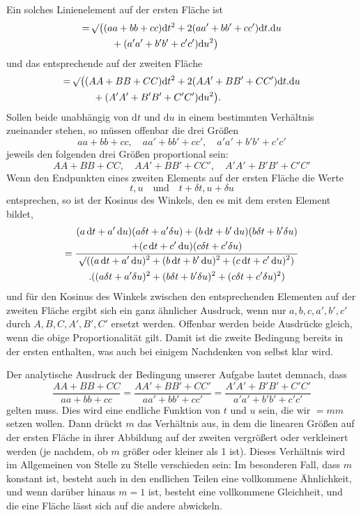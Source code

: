 Ein solches Linienelement auf der ersten Fläche ist
\[
\begin{aligned}
={}&\mathord{{}^{}\!\surd}\bigl((aa+bb+cc)\mathrm{d}t^2+2(aa'+bb'+cc')\mathrm{d}t\mathord{.}\mathrm{d}u\\
&\qquad+(a'a'+b'b'+c'c')\mathrm{d}u^2\bigr)
\end{aligned}
\]
\noindent und das entsprechende auf der zweiten Fläche
\[
\begin{aligned}
={}&\mathord{{}^{}\!\surd}\bigl((AA+BB+CC)\mathrm{d}t^2+2(AA'+BB'+CC')\mathrm{d}t\mathord{.}\mathrm{d}u\\
&\qquad+(A'A'+B'B'+C'C')\mathrm{d}u^2\bigr).
\end{aligned}
\]
\noindent Sollen beide unabhängig von \(\mathrm{d}t\) und \(\mathrm{d}u\) in einem bestimmten Verhältnis zueinander stehen, so müssen offenbar die drei Größen
\[
aa+bb+cc,\quad aa'+bb'+cc',\quad a'a'+b'b'+c'c'
\]
\noindent jeweils den folgenden drei Größen proportional sein:
\[
AA+BB+CC,\quad AA'+BB'+CC',\quad A'A'+B'B'+C'C'
\]
\noindent Wenn den Endpunkten eines zweiten Elements auf der ersten Fläche die Werte
\[
t,u\quad\text{und}\quad t+\delta t,u+\delta u
\]
\noindent entsprechen, so ist der Kosinus des Winkels, den es mit dem ersten Element bildet,
\[
=\frac{\begin{gathered}(a\,\mathrm{d}t+a'\,\mathrm{d}u)(a\delta t+a'\delta u)+(b\,\mathrm{d}t+b'\,\mathrm{d}u)(b\delta t+b'\delta u)\\+(c\,\mathrm{d}t+c'\,\mathrm{d}u)(c\delta t+c'\delta u)\end{gathered}}{\begin{gathered}\mathord{{}^{}\!\surd}((a\,\mathrm{d}t+a'\,\mathrm{d}u)^2+(b\,\mathrm{d}t+b'\,\mathrm{d}u)^2+(c\,\mathrm{d}t+c'\,\mathrm{d}u)^2)\\\mathord{.}((a\delta t+a'\delta u)^2+(b\delta t+b'\delta u)^2+(c\delta t+c'\delta u)^2)\end{gathered}}
\]
\noindent und für den Kosinus des Winkels zwischen den entsprechenden Elementen auf der zweiten Fläche ergibt sich ein ganz ähnlicher Ausdruck, wenn nur \(a,b,c,a',b',c'\) durch \(A,B,C,A',B',C'\) ersetzt werden. Offenbar werden beide Ausdrücke gleich, wenn die obige Proportionalität gilt. Damit ist die zweite Bedingung bereits in der ersten enthalten, was auch bei einigem Nachdenken von selbst klar wird.

Der analytische Ausdruck der Bedingung unserer Aufgabe lautet demnach, dass
\[
\frac{AA+BB+CC}{aa+bb+cc}=\frac{AA'+BB'+CC'}{aa'+bb'+cc'}=\frac{A'A'+B'B'+C'C'}{a'a'+b'b'+c'c'}
\]
\noindent gelten muss. Dies wird eine endliche Funktion von \(t\) und \(u\) sein, die wir \(=mm\) setzen wollen. Dann drückt \(m\) das Verhältnis aus, in dem die linearen Größen auf der ersten Fläche in ihrer Abbildung auf der zweiten vergrößert oder verkleinert werden (je nachdem, ob \(m\) größer oder kleiner als 1 ist). Dieses Verhältnis wird im Allgemeinen von Stelle zu Stelle verschieden sein: Im besonderen Fall, dass \(m\) konstant ist, besteht auch in den endlichen Teilen eine vollkommene Ähnlichkeit, und wenn darüber hinaus \(m=1\) ist, besteht eine vollkommene Gleichheit, und die eine Fläche lässt sich auf die andere abwickeln.

